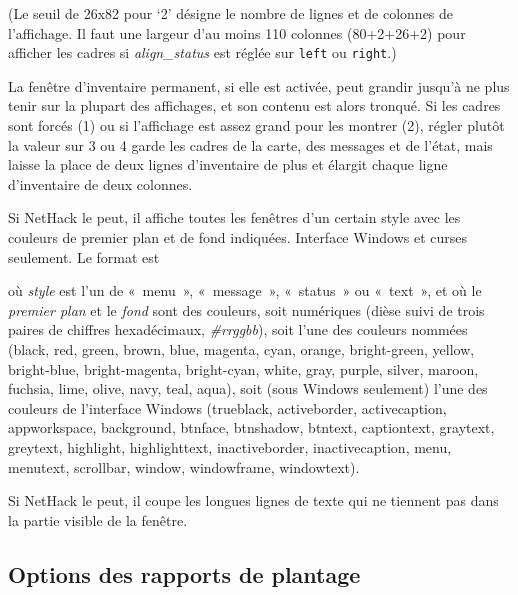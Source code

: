 \documentclass[titlepage]{article}
\begin{document}
\begin{description}
(Le seuil de 26x82 pour `2' désigne le nombre de lignes et de colonnes
de l'affichage.
Il faut une largeur d'au moins 110 colonnes (80+2+26+2) pour afficher les
cadres si
\textit{align\_status}
est réglée sur \texttt{left} ou \texttt{right}.)


La fenêtre d'inventaire permanent, si elle est activée, peut grandir
jusqu'à ne plus tenir sur la plupart des affichages, et son contenu est
alors tronqué.
Si les cadres sont forcés (1) ou si l'affichage est assez grand pour les
montrer (2), régler plutôt la valeur sur 3 ou 4 garde les cadres de la
carte, des messages et de l'état, mais laisse la place de deux lignes
d'inventaire de plus et élargit chaque ligne d'inventaire de deux
colonnes.

\item[{windowcolors}]
Si NetHack le peut, il affiche toutes les fenêtres d'un certain style avec
les couleurs de premier plan et de fond indiquées.
Interface Windows et curses seulement.
Le format est

\item[{\texttt{OPTION=windowcolors:\textit{style premier-plan\texttt{/\textit{fond}}}}}]


où \textit{style} est l'un de «~menu~», «~message~»,
«~status~» ou «~text~», et où le \textit{premier plan} et le
\textit{fond} sont des couleurs, soit numériques (dièse suivi de trois paires
de chiffres hexadécimaux, \textit{\#rrggbb}), soit l'une des couleurs nommées
(black, red, green, brown, blue, magenta, cyan, orange, bright-green,
yellow, bright-blue, bright-magenta, bright-cyan, white, gray, purple,
silver, maroon, fuchsia, lime, olive, navy, teal, aqua), soit (sous Windows
seulement) l'une des couleurs de l'interface Windows (trueblack,
activeborder, activecaption, appworkspace, background, btnface, btnshadow,
btntext, captiontext, graytext, greytext, highlight, highlighttext,
inactiveborder, inactivecaption, menu, menutext, scrollbar, window,
windowframe, windowtext).

\item[{wraptext}]
Si NetHack le peut, il coupe les longues lignes de texte qui ne tiennent
pas dans la partie visible de la fenêtre.

\end{description}
\subsection{Options des rapports de plantage}
\end{document}
